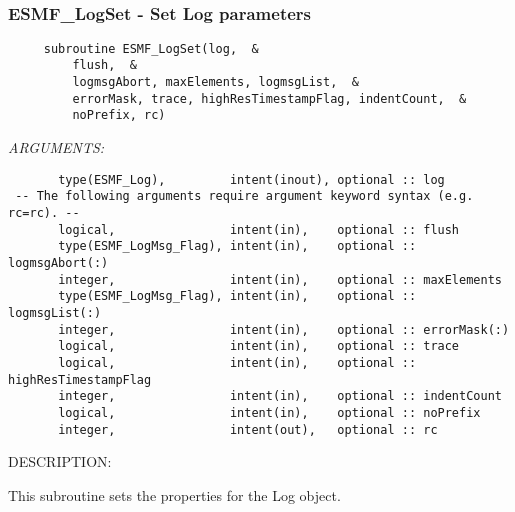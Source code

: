  
\mbox{}\hrulefill\ 
 
\subsubsection [ESMF\_LogSet] {ESMF\_LogSet - Set Log parameters}


 
\begin{verbatim}     subroutine ESMF_LogSet(log,  &
         flush,  &
         logmsgAbort, maxElements, logmsgList,  &
         errorMask, trace, highResTimestampFlag, indentCount,  &
         noPrefix, rc)\end{verbatim}{\em ARGUMENTS:}
\begin{verbatim}       type(ESMF_Log),         intent(inout), optional :: log
 -- The following arguments require argument keyword syntax (e.g. rc=rc). --
       logical,                intent(in),    optional :: flush
       type(ESMF_LogMsg_Flag), intent(in),    optional :: logmsgAbort(:)
       integer,                intent(in),    optional :: maxElements
       type(ESMF_LogMsg_Flag), intent(in),    optional :: logmsgList(:)
       integer,                intent(in),    optional :: errorMask(:)
       logical,                intent(in),    optional :: trace
       logical,                intent(in),    optional :: highResTimestampFlag
       integer,                intent(in),    optional :: indentCount
       logical,                intent(in),    optional :: noPrefix
       integer,                intent(out),   optional :: rc
 \end{verbatim}
{\sf DESCRIPTION:\\ }


        This subroutine sets the properties for the Log object.
  
